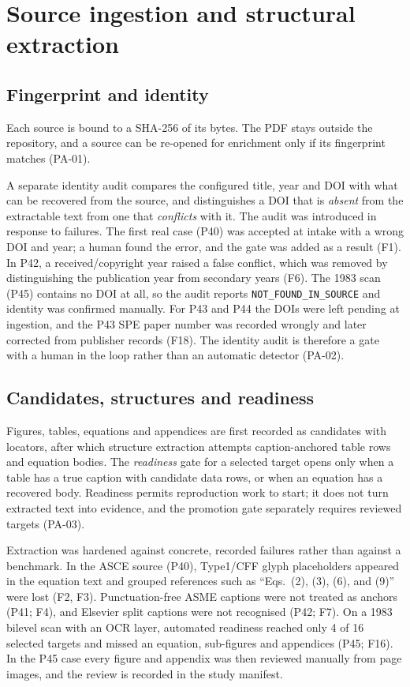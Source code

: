 \section{Source ingestion and structural extraction}
\label{sec:ingestion}

\subsection{Fingerprint and identity}
Each source is bound to a SHA-256 of its bytes. The PDF stays outside the repository, and a source can be re-opened for enrichment only if its fingerprint matches (PA-01).

A separate identity audit compares the configured title, year and DOI with what can be recovered from the source, and distinguishes a DOI that is \emph{absent} from the extractable text from one that \emph{conflicts} with it. The audit was introduced in response to failures. The first real case (P40) was accepted at intake with a wrong DOI and year; a human found the error, and the gate was added as a result (F1). In P42, a received/copyright year raised a false conflict, which was removed by distinguishing the publication year from secondary years (F6). The 1983 scan (P45) contains no DOI at all, so the audit reports \texttt{NOT\_FOUND\_IN\_SOURCE} and identity was confirmed manually. For P43 and P44 the DOIs were left pending at ingestion, and the P43 SPE paper number was recorded wrongly and later corrected from publisher records (F18). The identity audit is therefore a gate with a human in the loop rather than an automatic detector (PA-02).

\subsection{Candidates, structures and readiness}
Figures, tables, equations and appendices are first recorded as candidates with locators, after which structure extraction attempts caption-anchored table rows and equation bodies. The \emph{readiness} gate for a selected target opens only when a table has a true caption with candidate data rows, or when an equation has a recovered body. Readiness permits reproduction work to start; it does not turn extracted text into evidence, and the promotion gate separately requires reviewed targets (PA-03).

Extraction was hardened against concrete, recorded failures rather than against a benchmark. In the ASCE source (P40), Type1/CFF glyph placeholders appeared in the equation text and grouped references such as ``Eqs.~(2), (3), (6), and (9)'' were lost (F2, F3). Punctuation-free ASME captions were not treated as anchors (P41; F4), and Elsevier split captions were not recognised (P42; F7). On a 1983 bilevel scan with an OCR layer, automated readiness reached only 4 of 16 selected targets and missed an equation, sub-figures and appendices (P45; F16). In the P45 case every figure and appendix was then reviewed manually from page images, and the review is recorded in the study manifest.

